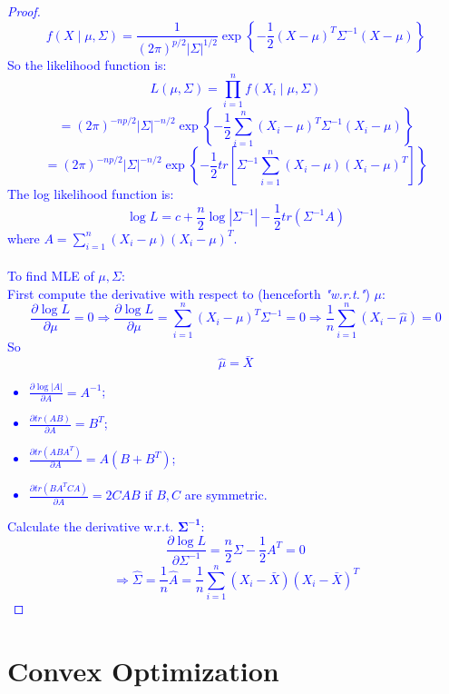 \documentclass[12pt]{book}
\theoremstyle{definition}
\theoremstyle{remark}
\begin{document}
\textcolor{blue}{
\begin{proof}
\[
f(X \mid \mu, \Sigma) = \frac{1}{(2\pi)^{p/2} |\Sigma|^{1/2}} \exp \left\{ -\frac{1}{2} (X - \mu)^T \Sigma^{-1} (X - \mu) \right\}
\]
So the likelihood function is:
\[L(\mu, \Sigma) = \prod_{i=1}^{n} f(X_i \mid \mu, \Sigma)\]
\[= (2\pi)^{-np/2} |\Sigma|^{-n/2} \exp \left\{ -\frac{1}{2} \sum_{i=1}^{n} (X_i - \mu)^T \Sigma^{-1} (X_i - \mu) \right\}\]
\[= (2\pi)^{-np/2} |\Sigma|^{-n/2} \exp \left\{ -\frac{1}{2} tr[ \Sigma^{-1}\sum_{i=1}^{n} (X_i - \mu)(X_i - \mu)^T] \right\}\]
The log likelihood function is:
\[\log L = c + \frac{n}{2} \log |\Sigma^{-1}| - \frac{1}{2} tr (\Sigma^{-1} A)\]
where $A = \sum_{i=1}^{n} (X_i - \mu) (X_i - \mu)^T$.\\
\\
To find MLE of \( \mu, \Sigma \):\\
First compute the derivative with respect to (henceforth \textit{"w.r.t."}) $\mu$:
\[\frac{\partial \log L}{\partial \mu} = 0
\Rightarrow \frac{\partial \log L}{\partial \mu} = \sum_{i=1}^{n} (X_i - \mu) ^T \Sigma^{-1} = 0
\Rightarrow \frac{1}{n} \sum_{i=1}^{n} (X_i - \hat{\mu}) = 0\]
So\[\hat{\mu} = \bar{X}\]
\begin{notionbox}[Note]
\begin{itemize}
    \item $\frac{\partial \log |A|}{\partial A} = A^{-1}$;
    \item $\frac{\partial tr(AB)}{\partial A} = B^T$;
    \item $\frac{\partial tr(A B A^T)}{\partial A} = A(B + B^T)$;
    \item $\frac{\partial tr(BA^TCA)}{\partial A} = 2 CAB$ if $B,C$ are symmetric.
\end{itemize}
\end{notionbox}
Calculate the derivative w.r.t. \(\mathbf{\Sigma^{-1}}\):
\[\frac{\partial \log L}{\partial \Sigma^{-1}} = \frac{n}{2} \Sigma - \frac{1}{2} A^T = 0\]
\[\Rightarrow \hat{\Sigma} = \frac{1}{n} \hat{A} = \frac{1}{n}\sum_{i=1}^{n} (X_i - \bar{X}) (X_i - \bar{X})^T\]
\end{proof}
}
\newpage
\section{Convex Optimization}
\end{document}
